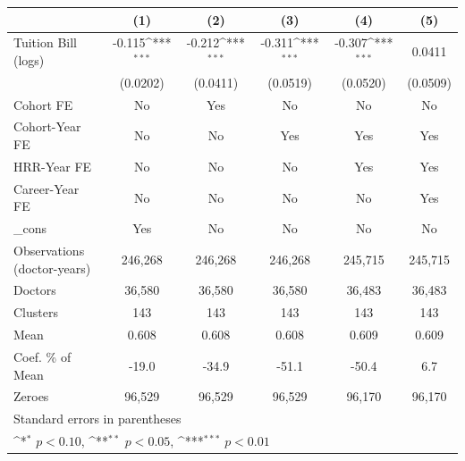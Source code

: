 {
\def\sym#1{\ifmmode^{#1}\else\(^{#1}\)\fi}
\begin{tabular}{l*{5}{c}}
\hline\hline
                    &\multicolumn{1}{c}{(1)}         &\multicolumn{1}{c}{(2)}         &\multicolumn{1}{c}{(3)}         &\multicolumn{1}{c}{(4)}         &\multicolumn{1}{c}{(5)}         \\
\hline
Tuition Bill (logs) &      -0.115\sym{***}&      -0.212\sym{***}&      -0.311\sym{***}&      -0.307\sym{***}&      0.0411         \\
                    &    (0.0202)         &    (0.0411)         &    (0.0519)         &    (0.0520)         &    (0.0509)         \\
[1em]
Cohort FE           &          No         &         Yes         &          No         &          No         &          No         \\
[1em]
Cohort-Year FE      &          No         &          No         &         Yes         &         Yes         &         Yes         \\
[1em]
HRR-Year FE         &          No         &          No         &          No         &         Yes         &         Yes         \\
[1em]
Career-Year FE      &          No         &          No         &          No         &          No         &         Yes         \\
[1em]
\_cons              &         Yes         &          No         &          No         &          No         &          No         \\
\hline
Observations (doctor-years)&     246,268         &     246,268         &     246,268         &     245,715         &     245,715         \\
Doctors             &      36,580         &      36,580         &      36,580         &      36,483         &      36,483         \\
Clusters            &         143         &         143         &         143         &         143         &         143         \\
Mean                &       0.608         &       0.608         &       0.608         &       0.609         &       0.609         \\
Coef. \% of Mean    &       -19.0         &       -34.9         &       -51.1         &       -50.4         &         6.7         \\
Zeroes              &      96,529         &      96,529         &      96,529         &      96,170         &      96,170         \\
\hline\hline
\multicolumn{6}{l}{\footnotesize Standard errors in parentheses}\\
\multicolumn{6}{l}{\footnotesize \sym{*} \(p<0.10\), \sym{**} \(p<0.05\), \sym{***} \(p<0.01\)}\\
\end{tabular}
}
